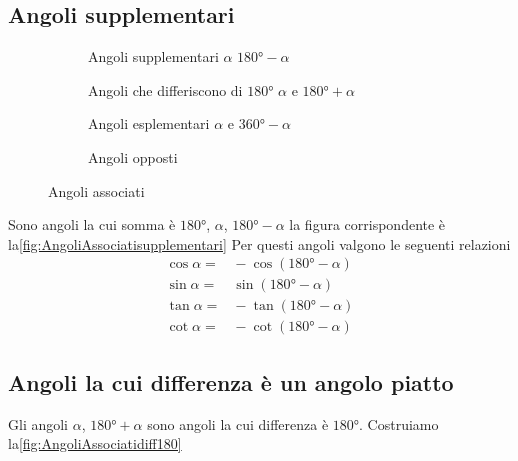 \subsection{Angoli supplementari}
\begin{figure}
	\centering
	\begin{subfigure}[b]{.48\linewidth}
	\centering
	\caption{Angoli supplementari $\alpha$ $\ang{180}-\alpha$}\label{fig:AngoliAssociatisupplementari}		
 \end{subfigure}
 \begin{subfigure}[b]{.48\linewidth}
 	\centering
 	
 	\caption{Angoli che differiscono di $\ang{180}$ $\alpha$ e $\ang{180}+\alpha$}
 	\label{fig:AngoliAssociatidiff180}	
 \end{subfigure}
 	\begin{subfigure}[b]{.49\linewidth}
 		\centering
 		
 		\caption{Angoli esplementari $\alpha$ e $\ang{360}-\alpha$}\label{fig:Angolidif360}
 	\end{subfigure}
 	\begin{subfigure}[b]{.49\linewidth}
 		\centering
 		
 		\caption{Angoli opposti}\label{fig:angoliopposti}
 	\end{subfigure}
\caption{Angoli associati}
	\label{fig:angoliassociatii}
\end{figure}
Sono angoli la cui somma è $\ang{180}$, $\alpha$, $\ang{180}-\alpha$ la figura corrispondente è la\nobs\vref{fig:AngoliAssociatisupplementari}
Per questi angoli valgono le seguenti relazioni
\begin{align*}
\cos\alpha=&{}-\cos(\ang{180}-\alpha)\\
\sin\alpha=&{}\sin(\ang{180}-\alpha)\\
\tan\alpha=&{}-\tan(\ang{180}-\alpha)\\
\cot\alpha=&{}-\cot(\ang{180}-\alpha)
\end{align*}
\subsection{Angoli la cui differenza è un angolo piatto}
\label{sub:Dif180}
Gli angoli $\alpha$, $\ang{180}+\alpha$ sono angoli la cui differenza è $\ang{180}$. Costruiamo la\nobs\vref{fig:AngoliAssociatidiff180}

